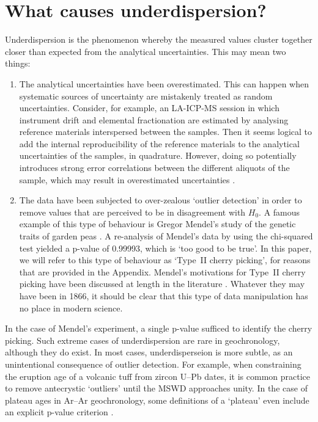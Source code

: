\documentclass{article}
\begin{document}
\section{What causes underdispersion?}\label{sec:causes}

Underdispersion is the phenomenon whereby the measured values cluster
together closer than expected from the analytical uncertainties.  This
may mean two things:

\begin{enumerate}
  \item The analytical uncertainties have been overestimated. This can
    happen when systematic sources of uncertainty are mistakenly
    treated as random uncertainties. Consider, for example, an
    LA-ICP-MS session in which instrument drift and elemental
    fractionation are estimated by analysing reference materials
    interspersed between the samples. Then it seems logical to add the
    internal reproducibility of the reference materials to the
    analytical uncertainties of the samples, in quadrature. However,
    doing so potentially introduces strong error correlations between
    the different aliquots of the sample, which may result in
    overestimated uncertainties \citep{mclean2016}.
  \item The data have been subjected to over-zealous `outlier
    detection' in order to remove values that are perceived to be in
    disagreement with $H_0$. A famous example of this type of
    behaviour is Gregor Mendel's study of the genetic traits of garden
    peas \citep{mendel1866}. A re-analysis of Mendel's data by
    \citet{fisher1936} using the chi-squared test yielded a p-value of
    0.99993, which is `too good to be true'. In this paper, we will
    refer to this type of behaviour as `Type~II cherry picking', for
    reasons that are provided in the Appendix. Mendel's motivations
    for Type~II cherry picking have been discussed at length in the
    literature \citep{radick2015}. Whatever they may have been in
    1866, it should be clear that this type of data manipulation has no
    place in modern science.
\end{enumerate}

In the case of Mendel's experiment, a single p-value sufficed to
identify the cherry picking. Such extreme cases of underdispersion are
rare in geochronology, although they do exist. In most cases,
underdisperseion is more subtle, as an unintentional consequence of
outlier detection. For example, when constraining the eruption age of
a volcanic tuff from zircon U--Pb dates, it is common practice to
remove antecrystic `outliers' until the MSWD approaches unity. In the
case of plateau ages in Ar--Ar geochronology, some definitions of a
`plateau' even include an explicit p-value criterion
\citep{jourdan2009}.\medskip
\end{document}
